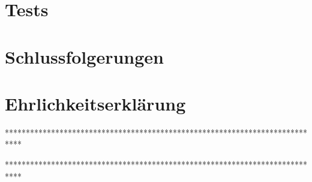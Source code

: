 \documentclass{fhnwreport/fhnwreport}
\begin{document}
\section*{Tests}
\label{sec:test}



\section*{Schlussfolgerungen}
\label{sec:schlussfolgerungen}



\section*{Ehrlichkeitserkl\"arung}
\label{sec:ehrlickeitserklaerung}



 **************************************************************************** %
\appendix
{}
 **************************************************************************** %





\end{document}

